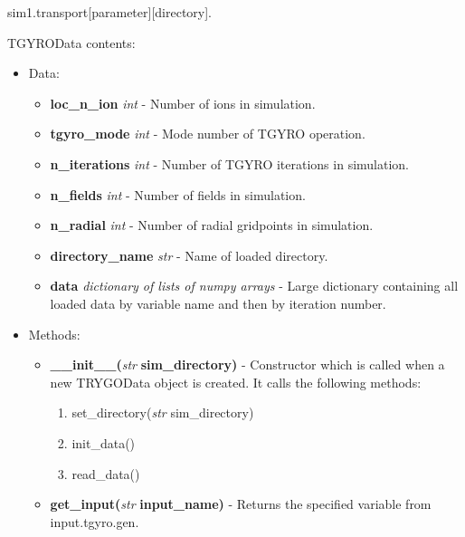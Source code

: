 \documentclass{article}
\begin{document}
\begin{itemize}
\begin{itemize}
sim1.transport[parameter][directory].
\end{itemize}
\end{itemize}

\newpage
TGYROData contents:
\begin{itemize}
\item Data:
\begin{itemize}
\item \textbf{loc\_n\_ion} \emph{int} - Number of ions in simulation.
\item \textbf{tgyro\_mode} \emph{int} - Mode number of TGYRO operation.
\item \textbf{n\_iterations} \emph{int} - Number of TGYRO iterations in simulation.
\item \textbf{n\_fields} \emph{int} - Number of fields in simulation.
\item \textbf{n\_radial} \emph{int} - Number of radial gridpoints in simulation.
\item \textbf{directory\_name} \emph{str} - Name of loaded directory.
\item \textbf{data} \emph{dictionary of lists of numpy arrays} - Large dictionary containing all loaded data by variable name and then by iteration number.
\end{itemize}
\item Methods:
\begin{itemize}
\item \textbf{\_\_init\_\_(}\emph{str} \textbf{ sim\_directory)} - Constructor which is called when a new TRYGOData object is created.  It calls the following methods:
\begin{enumerate}
\item set\_directory(\emph{str} sim\_directory)
\item init\_data()
\item read\_data()
\end{enumerate}
\item \textbf{get\_input(}\emph{str}\textbf{ input\_name)} - Returns the specified variable from input.tgyro.gen.


\end{itemize}
\end{itemize}
\end{document}
